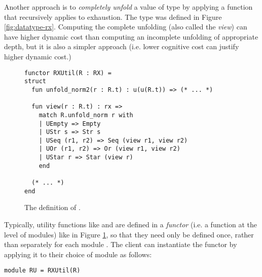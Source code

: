 Another approach is to \emph{completely unfold} a value of type  by applying a function  that recursively applies  to exhaustion. The type  was defined in Figure \ref{fig:datatype-rx}.  Computing the complete unfolding (also called the \emph{view}) can have higher dynamic cost than computing an incomplete unfolding of appropriate depth, but it is also a simpler approach (i.e.   lower cognitive cost can justify higher dynamic cost.)


\begin{figure}[t]
\begin{lstlisting}[numbers=none]
functor RXUtil(R : RX) = 
struct
  fun unfold_norm2(r : R.t) : u(u(R.t)) => (* ... *)

  fun view(r : R.t) : rx => 
    match R.unfold_norm r with 
    | UEmpty => Empty
    | UStr s => Str s
    | USeq (r1, r2) => Seq (view r1, view r2)
    | UOr (r1, r2) => Or (view r1, view r2)
    | UStar r => Star (view r)
    end 

  (* ... *)
end
\end{lstlisting}
\vspace{-5px}
\caption{The definition of .}
\vspace{-5px}
\label{fig:RXUtil}
\end{figure}
Typically, utility functions like  and  are defined in a \emph{functor} (i.e. a function at the level of modules) like  in Figure \ref{fig:RXUtil}, so that they need only be defined once, rather than separately for each module . The client can instantiate the functor by applying it to their choice of module as follows:
\begin{lstlisting}[numbers=none]
module RU = RXUtil(R)
\end{lstlisting}
